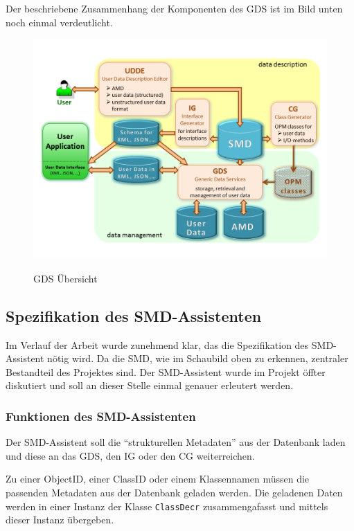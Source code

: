Der beschriebene Zusammenhang der Komponenten des \ac{GDS} ist im Bild unten noch einmal verdeutlicht.

\begin{figure}[!ht]
\centering
\includegraphics[width=13.5cm]{Bilder/UebersichtGDS}
\label{GDS \"Ubersicht}
\caption{GDS \"Ubersicht}
\centering
\end{figure}

\FloatBarrier

\subsection{Spezifikation des SMD-Assistenten}
Im Verlauf der Arbeit wurde zunehmend klar, das die Spezifikation des SMD-Assistent n\"otig wird. Da die \ac{SMD}, wie im Schaubild oben zu erkennen, zentraler Bestandteil des Projektes sind.
Der SMD-Assistent wurde im Projekt \"offter diskutiert und soll an dieser Stelle einmal genauer erleutert werden.

\subsubsection{Funktionen des SMD-Assistenten}
Der SMD-Assistent soll die "`strukturellen Metadaten"' aus der Datenbank laden und diese an das \ac{GDS}, den \ac{IG} oder den \ac{CG} weiterreichen. 

Zu einer ObjectID, einer ClassID oder einem Klassennamen m\"ussen die passenden Metadaten aus der Datenbank geladen werden.
Die geladenen Daten werden in einer Instanz der Klasse \texttt{ClassDecr} zusammengafasst und mittels dieser Instanz \"ubergeben.

